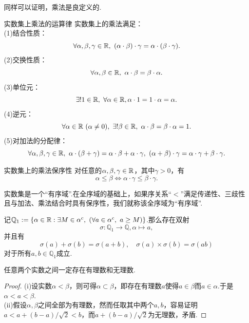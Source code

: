 同样可以证明，乘法是良定义的.

\begin{proposition}{实数集上乘法的运算律}
	实数集上的乘法满足： \\
	(1)结合性质：$$\forall \alpha ,\beta ,\gamma \in \mathbb{R} ,~(\alpha \cdot \beta ) \cdot \gamma = \alpha \cdot (\beta \cdot \gamma).$$
	(2)交换性质：$$\forall \alpha ,\beta \in \mathbb{R},~\alpha \cdot \beta = \beta \cdot \alpha .$$
	(3)单位元：$$\exists ! 1 \in \mathbb{R} ,~\forall \alpha \in \mathbb{R} , \alpha \cdot 1 = 1 \cdot \alpha = \alpha .$$
	(4)逆元：$$\forall \alpha \in \mathbb{R}~(\alpha \neq 0) ,~\exists ! \beta \in \mathbb{R} ,~\alpha \cdot \beta = \beta \cdot \alpha = 1.$$
	(5)对加法的分配律：$$\forall \alpha ,\beta ,\gamma \in \mathbb{R} ,~\alpha \cdot (\beta + \gamma) = \alpha \cdot \beta + \alpha \cdot \gamma ,~ (\alpha + \beta) \cdot \gamma = \alpha \cdot \gamma + \beta \cdot \gamma . $$
\end{proposition}

\begin{proposition}{实数集上的乘法保序性}
	对任意的$\alpha ,\beta ,\gamma \in \mathbb{R}$，其中$\gamma >0$，有$$\alpha \leq \beta \Leftrightarrow \alpha \cdot \gamma \leq \beta \cdot \gamma .$$
\end{proposition}

实数集是一个“有序域”.在全序域的基础上，如果序关系“$<$”满足传递性、三歧性且与加法、乘法结合时具有保序性，我们就称该全序域为“有序域”.

\begin{proposition}
	记$\mathbb{Q}_1:=\{ \alpha \in \mathbb{R} : \exists M \in \alpha ^c,~(\forall a \in \alpha ^c,~a \geq M) \}$.那么存在双射$$\sigma :\mathbb{Q}_1 \to \mathbb{Q},\alpha \mapsto a,$$
	并且有$$\sigma (a) + \sigma (b) = \sigma (a + b),\quad \sigma (a) \times \sigma (b) = \sigma (a  b)$$
	对于所有$a ,b \in \mathbb{Q}_1$成立.
\end{proposition}

\begin{corollary}
	任意两个实数之间一定存在有理数和无理数.
\end{corollary}
\begin{proof}
	(i)设实数$\alpha < \beta$，则可得$\alpha \subset \beta$，即存在有理数$a$使得$a \in \beta$而$a \in \alpha$.于是$\alpha < a < \beta$. \\
	(ii)假设$\alpha ,\beta$之间全部为有理数，然而任取其中两个$a,b$，容易证明$a<a+(b-a)/\sqrt{2}<b$，而$a+(b-a)/\sqrt{2}$为无理数，矛盾.
\end{proof}




